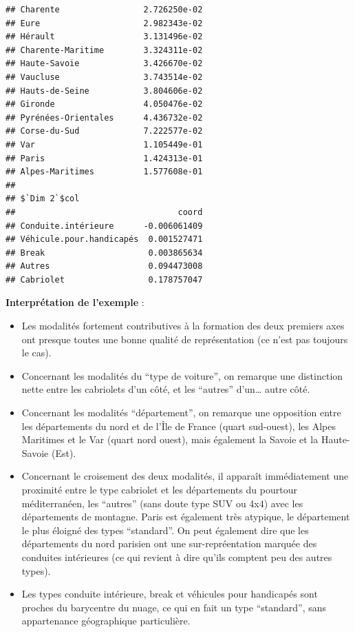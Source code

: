 \documentclass[]{book}
\providecommand{\tightlist}{%
  \setlength{\itemsep}{0pt}\setlength{\parskip}{0pt}}
\begin{document}
\begin{verbatim}
## Charente                 2.726250e-02
## Eure                     2.982343e-02
## Hérault                  3.131496e-02
## Charente-Maritime        3.324311e-02
## Haute-Savoie             3.426670e-02
## Vaucluse                 3.743514e-02
## Hauts-de-Seine           3.804606e-02
## Gironde                  4.050476e-02
## Pyrénées-Orientales      4.436732e-02
## Corse-du-Sud             7.222577e-02
## Var                      1.105449e-01
## Paris                    1.424313e-01
## Alpes-Maritimes          1.577608e-01
## 
## $`Dim 2`$col
##                                 coord
## Conduite.intérieure      -0.006061409
## Véhicule.pour.handicapés  0.001527471
## Break                     0.003865634
## Autres                    0.094473008
## Cabriolet                 0.178757047
\end{verbatim}

\textbf{Interprétation de l'exemple} :

\begin{itemize}
\tightlist
\item
  Les modalités fortement contributives à la formation des deux premiers axes ont presque toutes une bonne qualité de représentation (ce n'est pas toujours le cas).
\item
  Concernant les modalités du ``type de voiture'', on remarque une distinction nette entre les cabriolets d'un côté, et les ``autres'' d'un\ldots{} autre côté.
\item
  Concernant les modalités ``département'', on remarque une opposition entre les départements du nord et de l'Île de France (quart sud-ouest), les Alpes Maritimes et le Var (quart nord ouest), mais également la Savoie et la Haute-Savoie (Est).
\item
  Concernant le croisement des deux modalités, il apparaît immédiatement une proximité entre le type cabriolet et les départements du pourtour méditerranéen, les ``autres'' (sans doute type SUV ou 4x4) avec les départements de montagne. Paris est également très atypique, le département le plus éloigné des types ``standard''. On peut également dire que les départements du nord parisien ont une sur-repréentation marquée des conduites intérieures (ce qui revient à dire qu'ils comptent peu des autres types).
\item
  Les types conduite intérieure, break et véhicules pour handicapés sont proches du barycentre du nuage, ce qui en fait un type ``standard'', sans appartenance géographique particulière.
\end{itemize}
\end{document}
